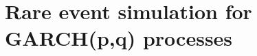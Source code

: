 \chapter[Rare event simulation for GARCH(p,q) processes]
        {{\huge Rare event simulation for GARCH(p,q) processes}}
\label{ch:ImportanceSampling}

